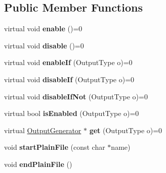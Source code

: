 \subsection*{Public Member Functions}
\begin{DoxyCompactItemize}
\item 
\mbox{\label{class_output_generator_a393e80a1e7b5ef29f6b9e1990ba615ce}} 
virtual void {\bfseries enable} ()=0
\item 
\mbox{\label{class_output_generator_a140c11a13a0fbf1c958fac25746a12b7}} 
virtual void {\bfseries disable} ()=0
\item 
\mbox{\label{class_output_generator_a6bd7a39cecc998dd5f743638e835903f}} 
virtual void {\bfseries enable\+If} (Output\+Type o)=0
\item 
\mbox{\label{class_output_generator_ac41cafbb9ae5b0d32870984e4fabe651}} 
virtual void {\bfseries disable\+If} (Output\+Type o)=0
\item 
\mbox{\label{class_output_generator_ae0d39ce32032866a4394aa5e8942be15}} 
virtual void {\bfseries disable\+If\+Not} (Output\+Type o)=0
\item 
\mbox{\label{class_output_generator_a802995a552743934a30dd82aae42694b}} 
virtual bool {\bfseries is\+Enabled} (Output\+Type o)=0
\item 
\mbox{\label{class_output_generator_ad366efdcaa9df2638110e5ce50efc71d}} 
virtual \mbox{\hyperlink{class_output_generator}{Output\+Generator}} $\ast$ {\bfseries get} (Output\+Type o)=0
\item 
\mbox{\label{class_output_generator_a719c9ddbba9ba72ec4881c4c61cccf8b}} 
void {\bfseries start\+Plain\+File} (const char $\ast$name)
\item 
\mbox{\label{class_output_generator_aaacf2b4efc09a2c06b9dd8cc2af69046}} 
void {\bfseries end\+Plain\+File} ()
\item 
\mbox{\label{class_output_generator_aefdf3f730d5c3ee46ae3d069f52b9e28}} 

\end{DoxyCompactItemize}
